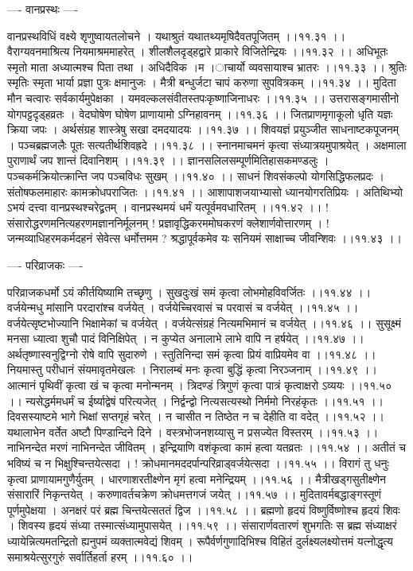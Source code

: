 \documentclass[11pt]{book}
\begin{document}
\begin{landscape}
---- वानप्रस्थः ----

वानप्रस्थविधिं वक्ष्ये शृणुष्वायतलोचने ।
यथाश्रुतं यथातथ्यमृषिदैवतपूजितम् ।।११.३१ ।।
वैराग्यवनमाश्रित्य नियमाश्रममाहरेत् ।
शीलशैलदृड्हद्वारे प्राकारे विजितेन्द्रियः ।।११.३२ ।।
अधिभूतः स्मृतो माता अध्यात्मश्च पिता तथा ।
अधिदैविक{ ।}म{ ।}ाचार्यो व्यवसायाश्च भ्रातरः ।।११.३३ ।।
श्रुतिः स्मृतिः स्मृता भार्या प्रज्ञा पुत्रः क्षमानुजः ।
मैत्री बन्धुर्जटा चापं करुणा सुपवित्रकम् ।।११.३४ ।।
मुदिता मौन चत्वारः सर्वकार्यमुपेक्षका ।
यमवल्कलसंवीतस्तपःकृष्णाजिनाधरः ।।११.३५ ।।
 उत्तरासङ्गमासीनो योगपट्टदृड्हव्रतः ।
वेदघोषेण घोषेण प्राणायामो ऽग्निहावनम् ।।११.३६ ।।
जितप्राणमृगाकूलो धृति यज्ञः क्रिया जपः ।
अर्थसंग्रह शास्त्रेषु सखा दमदयादयः ।।११.३७ ।।
शिवयज्ञं प्रयुञ्जीत साधनाष्टकपूजनम् ।
पञ्चब्रह्मजलैः पूतः सत्यतीर्थशिवह्रदे ।।११.३८ ।।
स्नानमाचमनं कृत्वा संध्यात्रयमुपाश्रयेत् ।
अक्षमाला पुराणार्थं जप शान्तं दिवानिशम् ।।११.३९ ।।
ज्ञानसलिलसम्पूर्णमितिहासकमण्डलुः ।
पञ्चकर्मक्रियोत्क्रान्ति जप पञ्चविधः सुखम् ।।११.४० ।।
साधनं शिवसंकल्पो योगसिद्धिफलप्रदः ।
संतोषफलमाहारः कामक्रोधपराजितः ।।११.४१ ।।
आशापाशजयाभ्यासो ध्यानयोगरतिप्रियः ।
अतिथिभ्यो ऽभयं दत्त्वा वानप्रस्थश्चरेद्व्रतम् ।
वानप्रस्थमयं धर्मं यत्पूर्वमवधारितम् ।।११.४२ ।।
! संसारोद्धरणमनित्यहरणमज्ञाननिर्मूलनम् 
! प्रज्ञावृद्धिकरममोघकरणं क्लेशार्णवोत्तारणम् ।
! जन्मव्याधिहरमकर्मदहनं सेवेत्स धर्मोत्तमम
? श्रद्धापूर्वकमेव यः सनियमं साक्षाच्च जीवन्शिवः ।।११.४३ ।।

---- परिव्राजकः ----

परिव्राजकधर्मो ऽयं कीर्तयिष्यामि तच्छृणु ।
सुखदुःखं समं कृत्वा लोभमोहविवर्जितः ।।११.४४ ।।
वर्जयेन्मधु मांसानि परदारांश्च वर्जयेत् ।
वर्जयेच्चिरवासं च परवासं च वर्जयेत् ।।११.४५ ।।
वर्जयेत्सृष्टभोज्यानि भिक्षामेकां च वर्जयेत् ।
वर्जयेत्संग्रहं नित्यमभिमानं च वर्जयेत् ।।११.४६ ।।
सुसूक्ष्मं मनसा ध्यात्वा शुचौ पादं विनिक्षिपेत् ।
न कुप्येत अनालाभे लाभे वापि न हर्षयेत् ।।११.४७ ।।
अर्थतृष्णास्वनुद्विग्नो रोषे वापि सुदारुणे ।
स्तुतिनिन्दा समं कृत्वा प्रियं वाप्रियमेव वा ।।११.४८ ।।
नियमास्तु परीधानं संयमावृतमेखलः ।
निरालम्बं मनः कृत्वा बुद्धिं कृत्वा निरञ्जनाम् ।।११.४९ ।।
आत्मानं पृथिवीं कृत्वा खं च कृत्वा मनोन्मनम् ।
त्रिदण्डं त्रिगुणं कृत्वा पात्रं कृत्वाक्षरो ऽव्ययः ।।११.५० ।।
न्यसेद्धर्ममधर्मं च ईर्ष्याद्वेषं परित्यजेत् ।
निर्द्वन्द्वो नित्यसत्यस्थो निर्ममो निरहंकृतः ।।११.५१ ।।
दिवसस्याष्टमे भागे भिक्षां सप्तगृहं चरेत् ।
न चासीत न तिष्ठेत न च देहीति वा वदेत् ।।११.५२ ।।
यथालाभेन वर्तेत अष्टौ पिण्डान्दिने दिने ।
वस्त्रभोजनशय्यासु न प्रसज्येत विस्तरम् ।।११.५३ ।।
नाभिनन्देत मरणं नाभिनन्देत जीवितम् ।
इन्द्रियाणि वशंकृत्वा कामं हत्वा यतव्रतः ।।११.५४ ।।
अतीतं च भविष्यं च न भिक्षुश्चिन्तयेत्सदा ।
! क्रोधमानमददर्पान्परिव्राड्वर्जयेत्सदा ।।११.५५ ।।
विरागं तु धनुः कृत्वा प्राणायामगुणैर्युतम् ।
धारणाशरतीक्ष्णेन मृगं हत्वा मनेन्द्रियम् ।।११.५६ ।।
मैत्रीखड्गसुतीक्ष्णेन संसारारिं निकृन्तयेत् ।
करुणावर्तचक्रेण क्रोधमत्तगजं जयेत् ।।११.५७ ।।
मुदितावर्मबद्धाङ्गस्तूणं पूर्णमुपेक्षया ।
अनक्षरं परं ब्रह्म चिन्तयेत्सततं द्विज ।।११.५८ ।।
ब्रह्मणो हृदयं विष्णुर्विष्णोश्च हृदयं शिवः ।
शिवस्य हृदयं संध्या तस्मात्संध्यामुपासयेत् ।।११.५९ ।।
संसारार्णवतारणं शुभगतिः स ब्रह्म संध्याक्षरं
ध्यायेन्नित्यमतन्द्रितो ह्यनुपमं व्यक्तात्मवेद्यं शिवम् ।
रूपैर्वर्णगुणादिभिश्च विहितं दुर्लक्ष्यलक्ष्योत्तमं
यत्नोद्धृत्य समाश्रयेत्सुरगुरुं सर्वार्तिहर्ता हरम् ।।११.६० ।।


\end{landscape}
\end{document}
